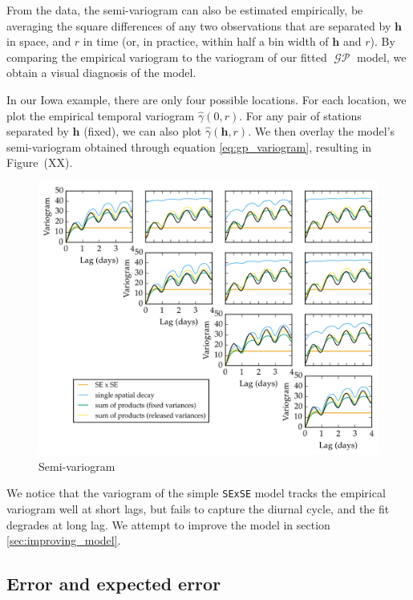 \documentclass[letter]{article}
\makeatletter
\def\maxwidth{\ifdim\Gin@nat@width>\linewidth\linewidth
\else\Gin@nat@width\fi}
\let\Oldincludegraphics\includegraphics
\renewcommand{\includegraphics}[1]{\Oldincludegraphics[width=.8\maxwidth]{#1}}
\newcommand{\genericdel}[3]{%
      \left#1#3\right#2
    }
\newcommand{\del}[1]{\genericdel(){#1}}
\DeclareMathOperator{\GP}{\mathcal{GP}}
\newcommand{\hvec}{\mathbold{h}}
\makeatother
\begin{document}
From the data, the semi-variogram can also be estimated empirically, be
averaging the square differences of any two observations that are
separated by \(\hvec\) in space, and \(r\) in time (or, in practice,
within half a bin width of \(\hvec\) and \(r\)). By comparing the
empirical variogram to the variogram of our fitted \(\GP\) model, we
obtain a visual diagnosis of the model.

In our Iowa example, there are only four possible locations. For each
location, we plot the empirical temporal variogram
\(\hat\gamma\del{0,r}\). For any pair of stations separated by \(\hvec\)
(fixed), we can also plot \(\hat\gamma\del{\hvec,r}\). We then overlay
the model's semi-variogram obtained through equation
\eqref{eq:gp_variogram}, resulting in Figure~(XX).

\begin{figure}
\centering
\includegraphics{figures/spatial_variogram.png}
\caption{Semi-variogram}
\end{figure}
    


    	We notice that the variogram of the simple \texttt{SExSE} model tracks
the empirical variogram well at short lags, but fails to capture the
diurnal cycle, and the fit degrades at long lag. We attempt to improve
the model in section \ref{sec:improving_model}.
    


    	\subsection{Error and expected error}\label{error-and-expected-error}
\end{document}
